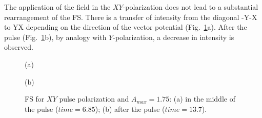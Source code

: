 The application of the field in the $XY$-polarization does not lead to a substantial rearrangement of the FS.
There is a transfer of intensity from the diagonal -Y-X to YX depending on the direction of the vector potential (Fig.~\ref{fig:FS_sq_latt_XY_field}a). After the pulse (Fig.~\ref{fig:FS_sq_latt_XY_field}b), by analogy with $Y$-polarization, a decrease in intensity is observed.
\begin{figure}[h!]
\begin{minipage}[h]{0.5\linewidth}
 (a) \\
\end{minipage}
\hfill
\begin{minipage}[h]{0.5\linewidth}
 (b) \\
\end{minipage}
\caption{FS for $XY$ pulse polarization and $A_{max}=1.75$: (a) in the middle of the pulse ($time=6.85$); (b) after the pulse ($time=13.7$).}
\label{fig:FS_sq_latt_XY_field}
\end{figure}

